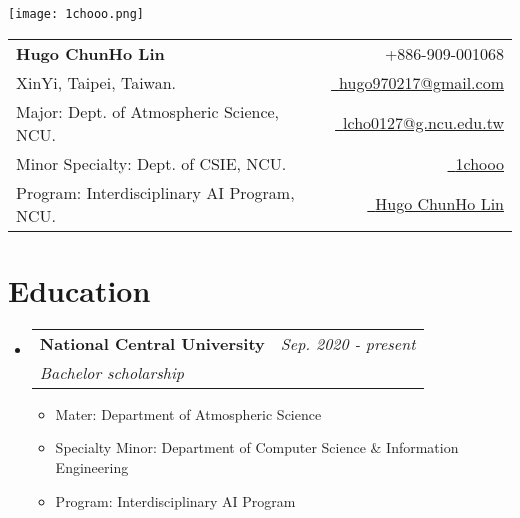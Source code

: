 \documentclass[a4paper,11pt]{article}
\makeatletter
\newcommand{\resumeSubheading}[4]{
\vspace{0.5mm}\item
    \begin{tabular*}{0.98\textwidth}[t]{l@{\extracolsep{\fill}}r}
        \textbf{#1} & \textit{\footnotesize{#4}} \\
        \textit{\footnotesize{#3}} &  \footnotesize{#2}\\
    \end{tabular*}
    \vspace{-2.4mm}
}
\newcommand{\resumeSubHeadingListStart}{\begin{itemize}[leftmargin=*,labelsep=0mm]}
\newcommand{\resumeItemListStart}{\begin{justify}\begin{itemize}[leftmargin=3ex, rightmargin=2ex, noitemsep,labelsep=1.2mm,itemsep=0mm]\small}
\newcommand{\resumeSubHeadingListEnd}{\end{itemize}\vspace{2mm}}
\newcommand{\resumeItemListEnd}{\end{itemize}\end{justify}\vspace{-2mm}}
\newcommand{\name}{Hugo ChunHo Lin} %
\newcommand{\course}{Dept. of Atmospheric Science, NCU.} %
\newcommand{\phone}{909-001068} %
\newcommand{\emaila}{hugo970217@gmail.com} %
\newcommand{\emailb}{lcho0127@g.ncu.edu.tw} %
\newcommand{\myScore}{}
\makeatother
\begin{document}
\selectfont


\parbox{2.35cm}{%
\texttt{[image: 1chooo.png]}
}
\parbox{\dimexpr\linewidth-2.8cm\relax}{
\begin{tabularx}{\linewidth}{L r} \\
  \textbf{\Large \name} & {\raisebox{0.0\height}{\footnotesize \faPhone}\ +886-\phone}\\
  XinYi, Taipei, Taiwan. & \href{mailto:\emaila}{\raisebox{0.0\height}{\footnotesize \faEnvelope}\ {\emaila}} \\
  Major: \course &  \href{mailto:\emailb}{\raisebox{0.0\height}{\footnotesize \faEnvelope}\ {\emailb}}\\
  {Minor Specialty: Dept. of CSIE, NCU.} &  \href{https://github.com/1chooo}{\raisebox{0.0\height}{\footnotesize \faGithub}\ {1chooo}} \\
  {Program: Interdisciplinary AI Program, NCU.} & \href{https://www.linkedin.com/in/1chooo/}{\raisebox{0.0\height}{\footnotesize \faLinkedin}\ {Hugo ChunHo Lin}}
\end{tabularx}
}




  
%

\section{\textbf{Education}}
  \resumeSubHeadingListStart
    \resumeSubheading
      {National Central University}{\myScore}
      {Bachelor scholarship}{Sep. 2020 - present}
      \vspace{-1.0mm}
      \resumeItemListStart
        \item {Mater: Department of Atmospheric Science}
        \item {Specialty Minor: Department of Computer Science \& Information Engineering}
        \item {Program: Interdisciplinary AI Program}
      \resumeItemListEnd      
  \resumeSubHeadingListEnd
\vspace{-8.5mm}
\end{document}
